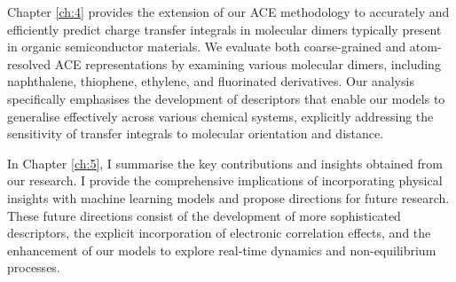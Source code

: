 Chapter \ref{ch:4} provides the extension of our ACE methodology to accurately and efficiently predict charge transfer integrals in molecular dimers typically present in organic semiconductor materials.  We evaluate both coarse-grained and atom-resolved ACE representations by examining various molecular dimers, including naphthalene, thiophene, ethylene, and fluorinated derivatives.  Our analysis specifically emphasises the development of descriptors that enable our models to generalise effectively across various chemical systems, explicitly addressing the sensitivity of transfer integrals to molecular orientation and distance.

In Chapter \ref{ch:5}, I summarise the key contributions and insights obtained from our research.  I provide the comprehensive implications of incorporating physical insights with machine learning models and propose directions for future research. These future directions consist of the development of more sophisticated descriptors, the explicit incorporation of electronic correlation effects, and the enhancement of our models to explore real-time dynamics and non-equilibrium processes.









